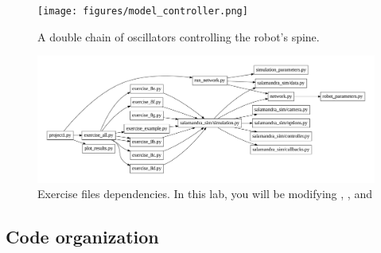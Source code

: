 \documentclass{cmc}
\begin{document}
\begin{figure}[h]
  \centering
  \texttt{[image: figures/model\_controller.png]}
  \caption[Controller model]{A double chain of oscillators controlling
    the robot’s spine.}
  \label{fig:controller-model}
\end{figure}

\begin{figure}[ht]
  \centering \includegraphics[width=1.0\textwidth]{figures/files}
  \caption{\label{fig:files} Exercise files dependencies. In this lab, you will
    be modifying , ,
     and }
\end{figure}


\subsection*{Code organization}
\label{subsec:code}
\end{document}
